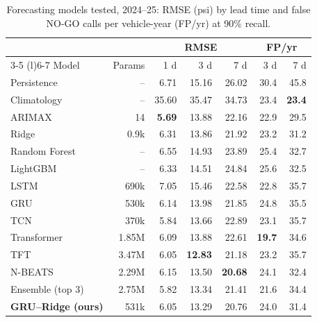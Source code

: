 \documentclass[conference]{IEEEtran}
\begin{document}
\begin{table}[t]
  \caption{Forecasting models tested, 2024--25: RMSE (psi) by lead time and false NO-GO calls
  per vehicle-year (FP/yr) at 90\% recall.}
  \label{tab:arch}
  \centering
  \footnotesize
  \setlength{\tabcolsep}{2.8pt}
  \begin{tabular}{@{}lrrrrrr@{}}
    \toprule
    & & \multicolumn{3}{c}{RMSE} & \multicolumn{2}{c}{FP/yr} \\
    \cmidrule(lr){3-5} \cmidrule(l){6-7}
    Model & Params & 1 d & 3 d & 7 d & 3 d & 7 d \\
    \midrule
    Persistence                          & --     & 6.71 & 15.16 & 26.02 & 30.4 & 45.8 \\
    Climatology                          & --     & 35.60 & 35.47 & 34.73 & 23.4 & \textbf{23.4} \\
    ARIMAX                               & 14     & \textbf{5.69} & 13.88 & 22.16 & 22.9 & 29.5 \\
    Ridge                                & 0.9k   & 6.31 & 13.86 & 21.92 & 23.2 & 31.2 \\
    Random Forest                        & --     & 6.55 & 14.93 & 23.89 & 25.4 & 32.7 \\
    LightGBM                             & --     & 6.33 & 14.51 & 24.84 & 25.6 & 32.5 \\
    LSTM~\cite{wang2024hess}             & 690k   & 7.05 & 15.46 & 22.58 & 22.8 & 35.7 \\
    GRU                                  & 530k   & 6.14 & 13.98 & 21.85 & 24.8 & 35.5 \\
    TCN                                  & 370k   & 5.84 & 13.66 & 22.89 & 23.1 & 35.7 \\
    Transformer~\cite{wang2024agwat}     & 1.85M  & 6.09 & 13.88 & 22.61 & \textbf{19.7} & 34.6 \\
    TFT                                  & 3.47M  & 6.05 & \textbf{12.83} & 21.18 & 23.2 & 35.7 \\
    N-BEATS                              & 2.29M  & 6.15 & 13.50 & \textbf{20.68} & 24.1 & 32.4 \\
    Ensemble (top 3)                     & 2.75M  & 5.82 & 13.34 & 21.41 & 21.6 & 34.4 \\
    \midrule
    \textbf{GRU--Ridge (ours)}           & 531k   & 6.05 & 13.29 & 20.76 & 24.0 & 31.4 \\
    \bottomrule
  \end{tabular}
\end{table}
\end{document}

